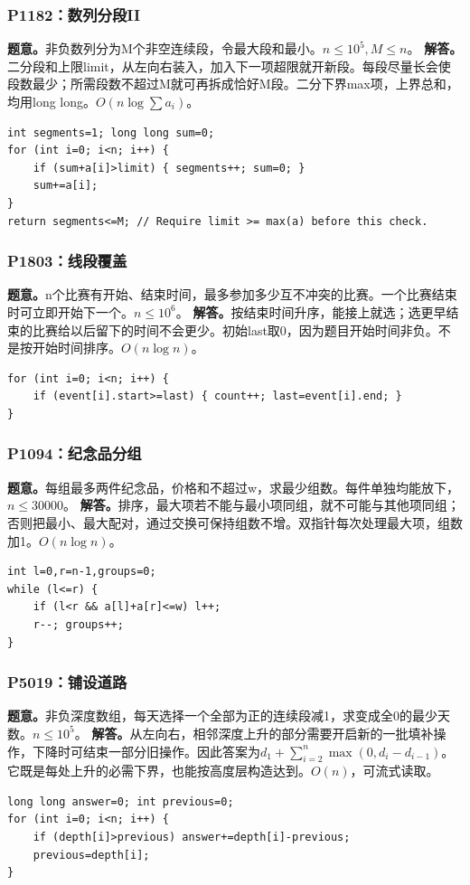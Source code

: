 \subsubsection{P1182：数列分段II}
\textbf{题意。}非负数列分为M个非空连续段，令最大段和最小。$n\le10^5,M\le n$。
\textbf{解答。}二分段和上限limit，从左向右装入，加入下一项超限就开新段。每段尽量长会使段数最少；所需段数不超过M就可再拆成恰好M段。二分下界max项，上界总和，均用long long。$O(n\log\sum a_i)$。
\begin{lstlisting}
int segments=1; long long sum=0;
for (int i=0; i<n; i++) {
    if (sum+a[i]>limit) { segments++; sum=0; }
    sum+=a[i];
}
return segments<=M; // Require limit >= max(a) before this check.
\end{lstlisting}

\subsubsection{P1803：线段覆盖}
\textbf{题意。}n个比赛有开始、结束时间，最多参加多少互不冲突的比赛。一个比赛结束时可立即开始下一个。$n\le10^6$。
\textbf{解答。}按结束时间升序，能接上就选；选更早结束的比赛给以后留下的时间不会更少。初始last取0，因为题目开始时间非负。不是按开始时间排序。$O(n\log n)$。
\begin{lstlisting}
for (int i=0; i<n; i++) {
    if (event[i].start>=last) { count++; last=event[i].end; }
}
\end{lstlisting}

\subsubsection{P1094：纪念品分组}
\textbf{题意。}每组最多两件纪念品，价格和不超过w，求最少组数。每件单独均能放下，$n\le30000$。
\textbf{解答。}排序，最大项若不能与最小项同组，就不可能与其他项同组；否则把最小、最大配对，通过交换可保持组数不增。双指针每次处理最大项，组数加1。$O(n\log n)$。
\begin{lstlisting}
int l=0,r=n-1,groups=0;
while (l<=r) {
    if (l<r && a[l]+a[r]<=w) l++;
    r--; groups++;
}
\end{lstlisting}

\subsubsection{P5019：铺设道路}
\textbf{题意。}非负深度数组，每天选择一个全部为正的连续段减1，求变成全0的最少天数。$n\le10^5$。
\textbf{解答。}从左向右，相邻深度上升的部分需要开启新的一批填补操作，下降时可结束一部分旧操作。因此答案为$d_1+\sum_{i=2}^n\max(0,d_i-d_{i-1})$。它既是每处上升的必需下界，也能按高度层构造达到。$O(n)$，可流式读取。
\begin{lstlisting}
long long answer=0; int previous=0;
for (int i=0; i<n; i++) {
    if (depth[i]>previous) answer+=depth[i]-previous;
    previous=depth[i];
}
\end{lstlisting}

